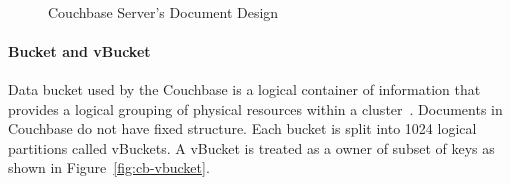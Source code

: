 \begin{figure}[h]
	\centering
	\\
	\centering
	\caption{Couchbase Server's Document Design ~\citep{couchbasedocs}}
	\label{fig:cb-views-document-design}	
\end{figure}

\paragraph{Bucket and vBucket}
 Data bucket used by the Couchbase is a logical container of information that provides a logical grouping of physical resources within a cluster~\citep{lichtenberg2013nosql}. Documents in Couchbase do not have fixed structure. Each bucket is split into 1024 logical partitions called vBuckets. A vBucket is treated as a owner of subset of keys as shown in Figure~\ref{fig:cb-vbucket}.  

